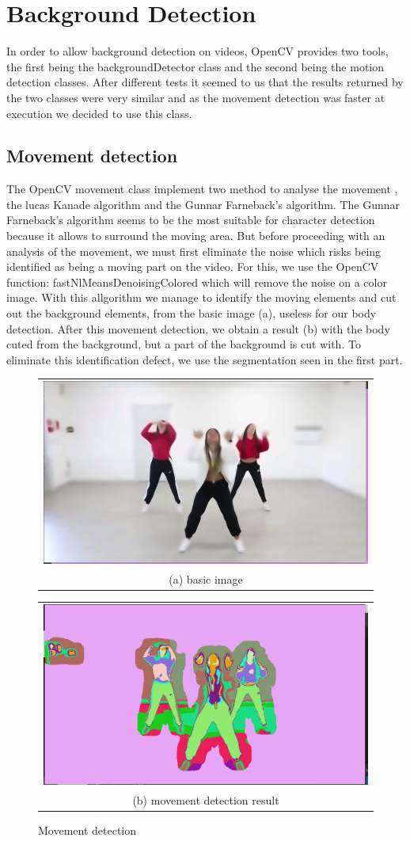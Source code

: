 \documentclass[conference]{IEEEtran}
\begin{document}
\section{Background Detection}

In order to allow background detection on videos, OpenCV provides two tools, the first being the backgroundDetector class and the second being the motion detection classes. After different tests it seemed to us that the results returned by the two classes were very similar and as the movement detection was faster at execution we decided to use this class.

\subsection{Movement detection}
 
The OpenCV movement class implement two method to analyse the movement , the lucas Kanade algorithm and the Gunnar Farneback’s algorithm. The Gunnar Farneback’s algorithm seems to be the most suitable for character detection because it allows to surround the moving area. But before proceeding with an analysis of the movement, we must first eliminate the noise which risks being identified as being a moving part on the video. For this, we use the OpenCV function: fastNlMeansDenoisingColored which will remove the noise on a color image.
With this allgorithm we manage to identify the moving elements and cut out the background elements, from the basic image (a), useless for our body detection.
After this movement detection, we obtain a result (b)  with the body cuted from the background, but a part of the background is cut with. To eliminate this identification defect, we use the segmentation seen in the first part.

\begin{figure}[h!]
  \centering
  \begin{tabular}{@{}c@{}}
    \includegraphics[width=0.4\linewidth]{fig5.png} \\[\abovecaptionskip]
    \small (a) basic image
  \end{tabular}
  \begin{tabular}{@{}c@{}}
    \includegraphics[width=0.4\linewidth]{fig6.png} \\[\abovecaptionskip]
    \small (b) movement detection result
  \end{tabular}
  \caption{Movement detection}
  \label{fig 2}
\end{figure}
\end{document}
